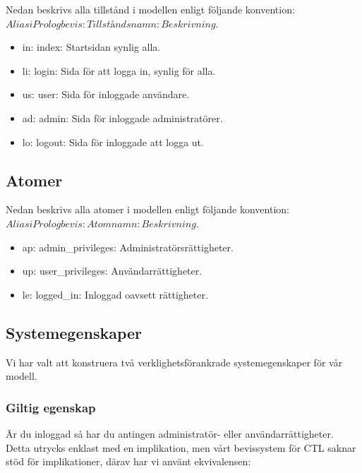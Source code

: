 \documentclass{article}
\begin{document}
  Nedan beskrivs alla tillstånd i modellen enligt följande konvention: $ Alias i
  Prolog bevis : Tillståndsnamn : Beskrivning$.

  \begin{itemize}

    \item in: index: Startsidan synlig alla.
    \item li: login: Sida för att logga in, synlig för alla.
    \item us: user: Sida för inloggade användare.
    \item ad: admin: Sida för inloggade administratörer. 
    \item lo: logout: Sida för inloggade att logga ut. 

  \end{itemize}

  \subsection{Atomer}

  Nedan beskrivs alla atomer i modellen enligt följande konvention: $ Alias i
  Prolog bevis : Atomnamn : Beskrivning$.

  \begin{itemize}

    \item ap: admin\_privileges: Administratörsrättigheter.
    \item up: user\_privileges: Användarrättigheter.
    \item le: logged\_in: Inloggad oavsett rättigheter.

  \end{itemize}


  \newpage

  \subsection{Systemegenskaper}
  Vi har valt att konstruera två verklighetsförankrade systemegenskaper för vår
  modell. 

  \subsubsection{Giltig egenskap}
  Är du inloggad så har du antingen administratör- eller användarrättigheter.
  Detta utrycks enklast med en implikation, men vårt bevissystem för CTL saknar
  stöd för implikationer, därav har vi använt ekvivalensen:
\end{document}
